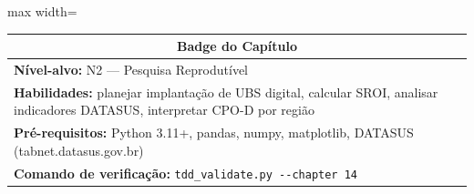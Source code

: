 
\begin{center}
\begin{minipage}{0.85\textwidth}
\begin{adjustbox}{max width=\textwidth}
\begin{tabular}{|p{}|}
\hline
\multicolumn{1}{|c|}{\textbf{\large Badge do Capítulo}} \\
\hline
\textbf{Nível-alvo:} N2 — Pesquisa Reprodutível \\
\textbf{Habilidades:} planejar implantação de UBS digital, calcular SROI,
analisar indicadores DATASUS, interpretar CPO-D por região \\
\textbf{Pré-requisitos:} Python 3.11+, pandas, numpy, matplotlib,
DATASUS (tabnet.datasus.gov.br) \\
\textbf{Comando de verificação:} \verb|tdd_validate.py --chapter 14| \\
\hline
\end{tabular}
\end{adjustbox}
\end{minipage}
\end{center}



